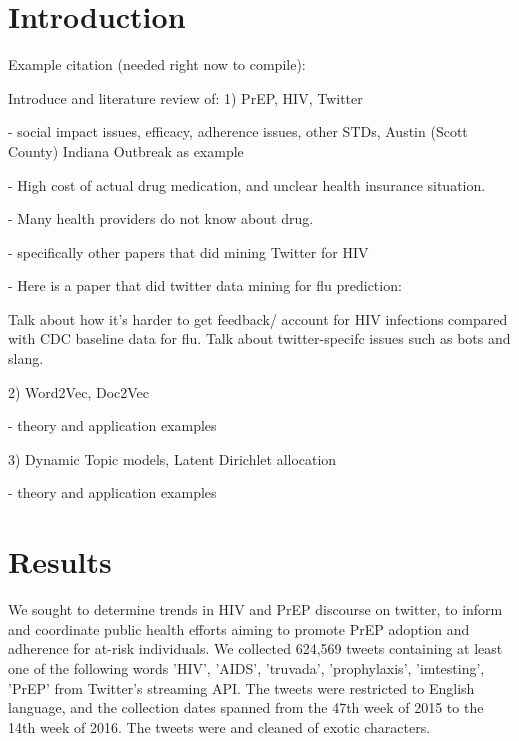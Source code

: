 \documentclass{sig-alternate-05-2015}
\begin{document}
%
%
\begin{CCSXML}

\end{CCSXML}


%
%

%
%
\printccsdesc



\section{Introduction}
Example citation (needed right now to compile):\cite{Lamport:LaTeX}

Introduce and literature review of:
1) PrEP, HIV, Twitter

 - social impact issues, efficacy, adherence issues, other STDs, Austin (Scott County) Indiana Outbreak as example
 
 - High cost of actual drug medication, and unclear health insurance situation.
 
 - Many health providers do not know about drug.
 
 - specifically other papers that did mining Twitter for HIV
 
 - Here is a paper that did twitter data mining for flu prediction:
 
 
 Talk about how it's harder to get feedback/ account for HIV infections compared with CDC baseline data for flu. Talk about twitter-specifc issues such as bots and slang.


2) Word2Vec, Doc2Vec

 - theory and application examples

3) Dynamic Topic models, Latent Dirichlet allocation

- theory and application examples

\section{Results}



We sought to determine trends in HIV and PrEP discourse on twitter, to inform and coordinate public health efforts aiming to promote PrEP adoption and adherence for at-risk individuals. We collected 624,569 tweets containing at least one of the following words 'HIV', 'AIDS', 'truvada', 'prophylaxis', 'imtesting', 'PrEP' from Twitter's streaming API. The tweets were restricted to English language, and the collection dates spanned from the 47th week of 2015 to the 14th week of 2016. The tweets were and cleaned of exotic characters.
\end{document}
